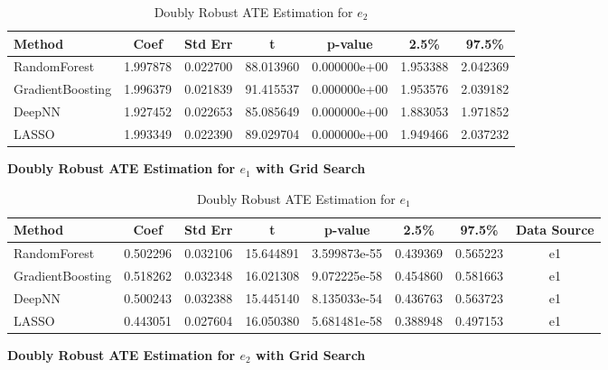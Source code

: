 \documentclass{article}
\begin{document}
\begin{table}[H]
  \centering
  \renewcommand{\arraystretch}{1.5}
  \begin{tabular}{|l|c|c|c|c|c|c|}
    \hline
    \textbf{Method} & \textbf{Coef} & \textbf{Std Err} & \textbf{t} & \textbf{p-value} & \textbf{2.5\%} & \textbf{97.5\%} \\
    \hline
    RandomForest & 1.997878 & 0.022700 & 88.013960 & 0.000000e+00 & 1.953388 & 2.042369 \\ \hline
    GradientBoosting & 1.996379 & 0.021839 & 91.415537 & 0.000000e+00 & 1.953576 & 2.039182 \\ \hline
    DeepNN & 1.927452 & 0.022653 & 85.085649 & 0.000000e+00 & 1.883053 & 1.971852 \\ \hline
    LASSO & 1.993349 & 0.022390 & 89.029704 & 0.000000e+00 & 1.949466 & 2.037232 \\ \hline
  \end{tabular}
  \caption{Doubly Robust ATE Estimation for $e_2$}
\end{table}

\textbf{Doubly Robust ATE Estimation for $e_1$ with Grid Search}

\begin{table}[H]
  \centering
  \renewcommand{\arraystretch}{1.5}
  \begin{tabular}{|l|c|c|c|c|c|c|c|}
    \hline
    \textbf{Method} & \textbf{Coef} & \textbf{Std Err} & \textbf{t} & \textbf{p-value} & \textbf{2.5\%} & \textbf{97.5\%} & \textbf{Data Source} \\
    \hline
    RandomForest & 0.502296 & 0.032106 & 15.644891 & 3.599873e-55 & 0.439369 & 0.565223 & e1 \\ \hline
    GradientBoosting & 0.518262 & 0.032348 & 16.021308 & 9.072225e-58 & 0.454860 & 0.581663 & e1 \\ \hline
    DeepNN & 0.500243 & 0.032388 & 15.445140 & 8.135033e-54 & 0.436763 & 0.563723 & e1 \\ \hline
    LASSO & 0.443051 & 0.027604 & 16.050380 & 5.681481e-58 & 0.388948 & 0.497153 & e1 \\ \hline
  \end{tabular}
  \caption{Doubly Robust ATE Estimation for $e_1$}
\end{table}

\textbf{Doubly Robust ATE Estimation for $e_2$ with Grid Search}
\end{document}

